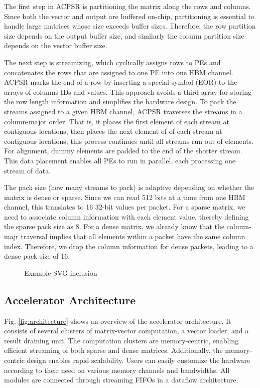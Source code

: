\documentclass[manuscript,screen,review]{acmart}
\begin{document}
The first step in ACPSR is partitioning the matrix along the rows and columns. Since both the vector and output are buffered on-chip, partitioning is essential to handle large matrices whose size exceeds buffer sizes. Therefore, the row partition size depends on the output buffer size, and similarly the column partition size depends on the vector buffer size.   

The next step is streamizing, which cyclically assigns rows to PEs and concatenates the rows that are assigned to one PE into one HBM channel. ACPSR marks the end of a row by inserting a special symbol (EOR) to the arrays of columns IDs and values. This approach avoids a third array for storing the row length information and simplifies the hardware design. To pack the streams assigned to a given HBM channel, ACPSR traverses the streams in a column-major order. That is, it places the first element of each stream at contiguous locations, then places the next element of of each stream at contiguous locations; this process continues until all streams run out of elements. For alignment, dummy elements are padded to the end of the shorter stream. This data placement enables all PEs to
run in parallel, each processing one stream of data.

The pack size (how many streams to pack) is adaptive depending on whether the matrix is dense or sparse. Since we can read 512 bits at a time from one HBM channel, this translates to 16 32-bit values per packet. For a sparse matrix, we need to associate column information with each element value, thereby defining the sparse pack size as 8. For a dense matrix, we already know that the column-majr traversal implies that all elements within a packet have the same column index. Therefore, we drop the column information for dense packets, leading to a dense pack size of 16. 


\begin{figure}[h]
	\centering
	
	\caption{Example SVG inclusion}
	\label{fig:mat_format}
\end{figure}

\subsection{Accelerator Architecture}
Fig. \ref{fig:architecture} shows an overview of the accelerator architecture. It consists of several clusters of matrix-vector computation, a vector loader, and a result draining unit. The computation clusters are memory-centric, enabling efficient streaming of both sparse and dense matrices. Additionally, the memory-centric design enables rapid scalability. Users can easily customize the hardware according to their need on various memory channels and bandwidths. All  modules are connected through streaming FIFOs in a dataflow architecture. 
\end{document}
